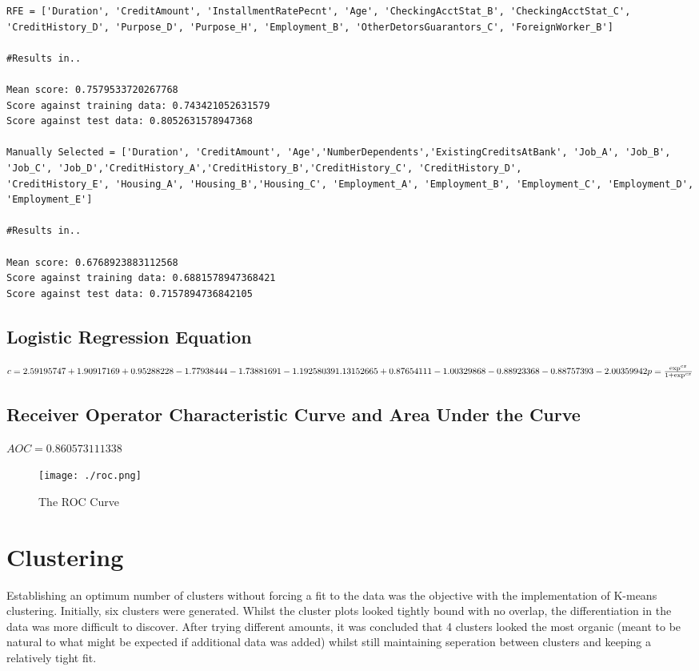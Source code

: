 \documentclass[a4paper]{article}
\begin{document}
\begin{lstlisting}
RFE = ['Duration', 'CreditAmount', 'InstallmentRatePecnt', 'Age', 'CheckingAcctStat_B', 'CheckingAcctStat_C', 'CreditHistory_D', 'Purpose_D', 'Purpose_H', 'Employment_B', 'OtherDetorsGuarantors_C', 'ForeignWorker_B']

#Results in..

Mean score: 0.7579533720267768
Score against training data: 0.743421052631579
Score against test data: 0.8052631578947368

Manually Selected = ['Duration', 'CreditAmount', 'Age','NumberDependents','ExistingCreditsAtBank', 'Job_A', 'Job_B', 'Job_C', 'Job_D','CreditHistory_A','CreditHistory_B','CreditHistory_C', 'CreditHistory_D',
'CreditHistory_E', 'Housing_A', 'Housing_B','Housing_C', 'Employment_A', 'Employment_B', 'Employment_C', 'Employment_D', 'Employment_E']

#Results in..

Mean score: 0.6768923883112568
Score against training data: 0.6881578947368421
Score against test data: 0.7157894736842105
\end{lstlisting}

\subsection{Logistic Regression Equation}
$
c = 2.59195747 + 1.90917169 + 0.95288228 -1.77938444 -1.73881691 -1.19258039
   1.13152665 + 0.87654111 -1.00329868 -0.88923368 -0.88757393 -2.00359942\\
\\
p = \frac{\exp^{cx}}{1 + \exp^{cx}}
$
\subsection{Receiver Operator Characteristic Curve and Area Under the Curve}
$
AOC = 0.860573111338
$
\begin{figure}[H]
\begin{center}
\texttt{[image: ./roc.png]}
\end{center}
\caption{The ROC Curve}
\end{figure}

\section{Clustering}

Establishing an optimum number of clusters without forcing a fit to the data was the objective with the implementation of K-means clustering.  Initially, six clusters were generated. Whilst the cluster plots looked tightly bound with no overlap, the differentiation in the data was more difficult to discover.  After trying different amounts, it was concluded that 4 clusters looked the most organic (meant to be natural to what might be expected if additional data was added) whilst still maintaining seperation between clusters and keeping a relatively tight fit.  
\end{document}
